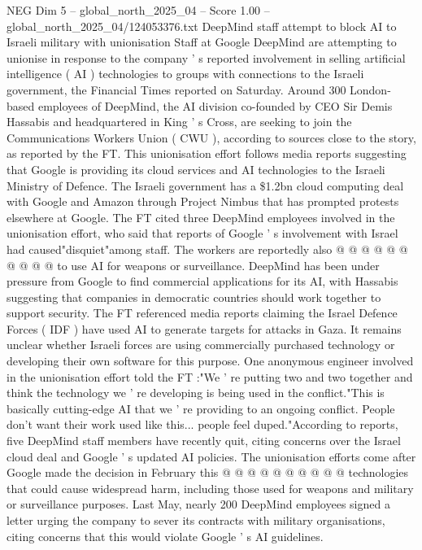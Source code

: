 \begin{textsample}{NEG Dim 5 – global\_north\_2025\_04 – Score 1.00 – global\_north\_2025\_04/124053376.txt}  \label{ex:f5_neg_347}
DeepMind staff attempt to block AI to Israeli military with unionisation Staff at Google DeepMind are attempting to unionise in response to the company ' s reported involvement in selling artificial intelligence ( AI ) technologies to groups with connections to the Israeli government, the Financial Times reported on Saturday.
Around 300 London-based employees of DeepMind, the AI division co-founded by CEO Sir Demis Hassabis and headquartered in King ' s Cross, are seeking to join the Communications Workers Union ( CWU ), according to sources close to the story, as reported by the FT.
This unionisation effort follows media reports suggesting that Google is providing its cloud services and AI technologies to the Israeli Ministry of Defence.
The Israeli government has a \$1.2bn cloud computing deal with Google and Amazon through Project Nimbus that has prompted protests elsewhere at Google.
The FT cited three DeepMind employees involved in the unionisation effort, who said that reports of Google ' s involvement with Israel had caused"disquiet"among staff.
The workers are reportedly also @ @ @ @ @ @ @ @ @ @ to use AI for weapons or surveillance.
DeepMind has been under pressure from Google to find commercial applications for its AI, with Hassabis suggesting that companies in democratic countries should work together to support security.
The FT referenced media reports claiming the Israel Defence Forces ( IDF ) have used AI to generate targets for attacks in Gaza.
It remains unclear whether Israeli forces are using commercially purchased technology or developing their own software for this purpose.
One anonymous engineer involved in the unionisation effort told the FT :"We ' re putting two and two together and think the technology we ' re developing is being used in the conflict."This is basically cutting-edge AI that we ' re providing to an ongoing conflict.
People don't want their work used like this... people feel duped."According to reports, five DeepMind staff members have recently quit, citing concerns over the Israel cloud deal and Google ' s updated AI policies.
The unionisation efforts come after Google made the decision in February this @ @ @ @ @ @ @ @ @ @ technologies that could cause widespread harm, including those used for weapons and military or surveillance purposes.
Last May, nearly 200 DeepMind employees signed a letter urging the company to sever its contracts with military organisations, citing concerns that this would violate Google ' s AI guidelines.

\end{textsample}
